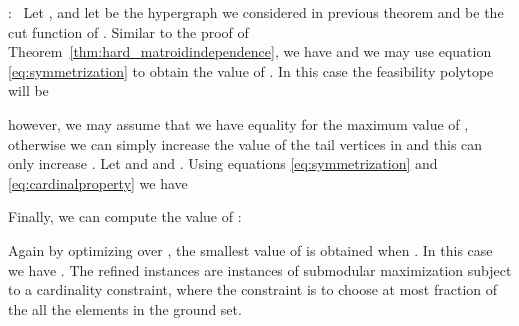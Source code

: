 \documentclass{article}[11pt]
\renewenvironment{proof}{\noindent{\bf Proof}:~}{\\}
\begin{document}
\medskip

\begin{proof}
Let , and let  be the hypergraph we considered in previous theorem
and  be the cut function of . Similar to the proof of 
Theorem~\ref{thm:hard_matroidindependence}, we have  and we may use
equation \eqref{eq:symmetrization} to obtain the value of .
In this case the feasibility polytope will be

however, we may assume that we have equality for the maximum value of ,
otherwise we can simply increase the  value of the tail vertices in 
and this can only increase . Let  and  and .
Using equations \eqref{eq:symmetrization} and \eqref{eq:cardinalproperty} we have

Finally, we can compute the value of :

Again by optimizing over , the smallest value of 
is obtained when . In this case we have .
The refined instances are instances of submodular maximization
subject to a cardinality constraint, where the constraint is to choose at most
 fraction of the all the elements in the ground set.
\end{proof}
\end{document}
